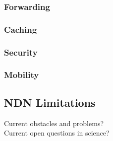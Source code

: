 \subsubsection{Forwarding}

\subsubsection{Caching}

\subsubsection{Security}

\subsubsection{Mobility}

\subsection{NDN Limitations}
Current obstacles and problems? \\
Current open questions in science?

